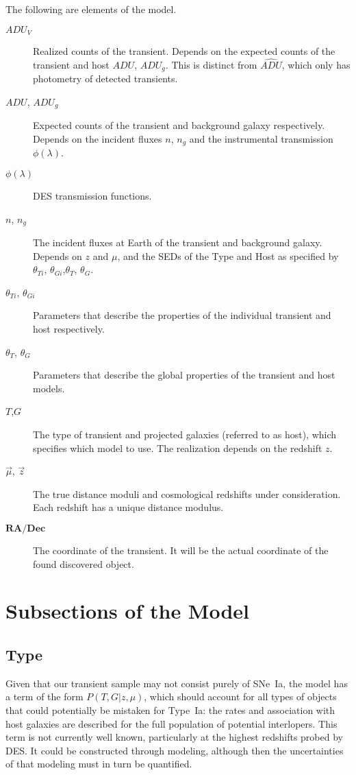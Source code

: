\documentclass[preprint]{aastex}
\begin{document}
The following are elements of the model.
\begin{description}
\item[$\mathit{ADU}_V$]  Realized counts
of the transient.  Depends
on the expected counts of the transient and host $\mathit{ADU}$, $\mathit{ADU}_g$.
This is distinct from $\hat{\mathit{ADU}}$, which only has photometry of detected transients.
\item[$\mathit{ADU}$, $\mathit{ADU}_{g}$]  Expected counts
of the transient and background galaxy respectively.  Depends
on the incident fluxes $n$, $n_g$ and the instrumental
transmission $\phi(\lambda)$.
\item[$\phi(\lambda)$] DES transmission functions.
\item[$n$, $n_g$] The incident fluxes at Earth of the transient and background
galaxy.  Depends on  $z$ and $\mu$, and the SEDs of the Type and Host as
specified by $\theta_{Ti}$, $\theta_{Gi}$,$\theta_{T}$, $\theta_{G}$.
\item[$\theta_{Ti}$, $\theta_{Gi}$] Parameters that describe the properties of the individual transient
and host respectively.
\item[$\theta_{T}$, $\theta_{G}$] Parameters that describe the global properties of the transient
and host models.
\item[$T$,$G$]  The type of transient and projected galaxies (referred to as host), which
specifies which model to use. The realization depends on the redshift $z$.
\item[$\vec{\mu}$, $\vec{z}$]  The true distance moduli and cosmological redshifts under
consideration.  Each redshift has a unique distance modulus.
\item[$\mathbf{RA/Dec}$] The coordinate of the transient.  It will be the actual coordinate of the found discovered object.
\end{description}

\section{Subsections of the Model}

\subsection{Type}
\label{type:sec}
Given that our transient sample may not consist purely of SNe~Ia, the model
has a term of the form $P(T, G | z,\mu)$, which should account for all types of
objects that could potentially be mistaken for Type~Ia:
the rates and association with host galaxies are described for
the full population of potential interlopers.
This term is not currently well known, particularly at the highest redshifts probed by DES.
It could be constructed through modeling, although then the uncertainties 
of that modeling must in turn be quantified.
\end{document}
